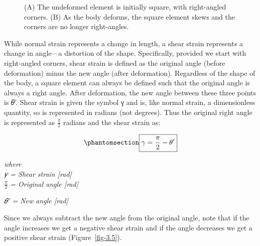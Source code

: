 \documentclass[
  letterpaper,
  DIV=11,
  numbers=noendperiod]{scrreprt}
\theoremstyle{definition}
\theoremstyle{remark}
\begin{document}
\begin{figure}


\caption{\label{fig-3.4}(A) The undeformed element is initially square,
with right-angled corners. (B) As the body deforms, the square element
skews and the corners are no longer right-angles.}

\end{figure}%

While normal strain represents a change in length, a shear strain
represents a change in angle---a distortion of the shape. Specifically,
provided we start with right-angled corners, shear strain is defined as
the original angle (before deformation) minus the new angle (after
deformation). Regardless of the shape of the body, a square element can
always be defined such that the original angle is always a right angle.
After deformation, the new angle between these three points is 𝜃'. Shear
strain is given the symbol γ and is, like normal strain, a dimensionless
quantity, so is represented in radians (not degrees). Thus the original
right angle is represented as \(\frac{\pi}{2}\) radians and the shear
strain as:

\begin{equation}\phantomsection\label{eq-3.2}{
\boxed{\gamma=\frac{\pi}{2}-\theta^{\prime}}
}\end{equation}

\emph{where}\\
\emph{𝛾 = Shear strain {[}rad{]}}\\
\(\frac{\pi}{2}\) \emph{= Original angle {[}rad{]}}

\emph{𝜃' = New angle {[}rad{]}}

Since we always subtract the new angle from the original angle, note
that if the angle increases we get a negative shear strain and if the
angle decreases we get a positive shear strain (Figure~\ref{fig-3.5}).
\end{document}
